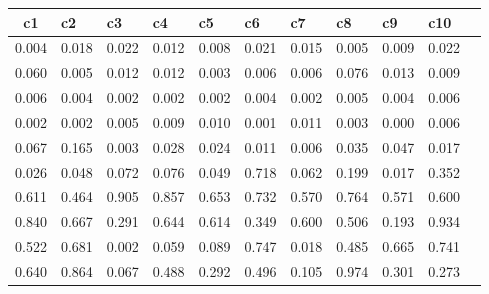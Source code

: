\begin{table}[htbp]
\begin{tabular}{|l|l|l|l|l|l|l|l|l|l|l|}\hline  
 \multicolumn{1}{c}{ c1 }  & c2  & c3  & c4  & c5  & c6  & c7  & c8  & c9  & c10  \\ \hline  
    0.004 &     0.018 &     0.022 &     0.012 &     0.008 &     0.021 &     0.015 &     0.005 &     0.009 &     0.022 \\ \hline 
    0.060 &     0.005 &     0.012 &     0.012 &     0.003 &     0.006 &     0.006 &     0.076 &     0.013 &     0.009 \\ \hline 
    0.006 &     0.004 &     0.002 &     0.002 &     0.002 &     0.004 &     0.002 &     0.005 &     0.004 &     0.006 \\ \hline 
    0.002 &     0.002 &     0.005 &     0.009 &     0.010 &     0.001 &     0.011 &     0.003 &     0.000 &     0.006 \\ \hline 
    0.067 &     0.165 &     0.003 &     0.028 &     0.024 &     0.011 &     0.006 &     0.035 &     0.047 &     0.017 \\ \hline 
    0.026 &     0.048 &     0.072 &     0.076 &     0.049 &     0.718 &     0.062 &     0.199 &     0.017 &     0.352 \\ \hline 
    0.611 &     0.464 &     0.905 &     0.857 &     0.653 &     0.732 &     0.570 &     0.764 &     0.571 &     0.600 \\ \hline 
    0.840 &     0.667 &     0.291 &     0.644 &     0.614 &     0.349 &     0.600 &     0.506 &     0.193 &     0.934 \\ \hline 
    0.522 &     0.681 &     0.002 &     0.059 &     0.089 &     0.747 &     0.018 &     0.485 &     0.665 &     0.741 \\ \hline 
    0.640 &     0.864 &     0.067 &     0.488 &     0.292 &     0.496 &     0.105 &     0.974 &     0.301 &     0.273 \\ \hline 
  \end{tabular}
\end{table}
